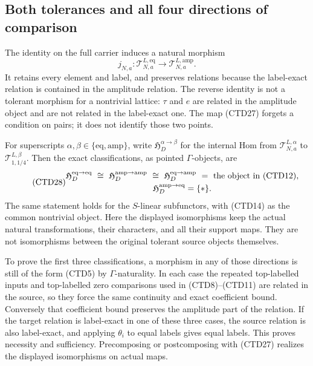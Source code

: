\subsection{Both tolerances and all four directions of comparison}

The identity on the full carrier induces a natural morphism
\begin{equation}\tag{CTD27}
j_{N,a}:\mathcal T^{L,\mathrm{eq}}_{N,a}
\longrightarrow\mathcal T^{L,\mathrm{amp}}_{N,a}.
\end{equation}
It retains every element and label, and preserves relations
because the label-exact relation is contained in the
amplitude relation. The reverse identity is not a tolerant
morphism for a nontrivial lattice: $\tau$ and $e$ are related
in the amplitude object and are not related in the label-exact
one. The map (CTD27) forgets a condition on pairs; it does
not identify those two points.

For superscripts $\alpha,\beta\in\{\mathrm{eq},\mathrm{amp}\}$,
write $\mathfrak H_D^{\alpha\to\beta}$ for the internal Hom
from $\mathcal T^{L,\alpha}_{N,a}$ to
$\mathcal T^{L,\beta}_{1,1/4}$. Then the exact classifications,
as pointed $\Gamma$-objects, are
\begin{equation}\tag{CTD28}
\begin{gathered}
\mathfrak H_D^{\mathrm{eq}\to\mathrm{eq}}
\ \cong\
\mathfrak H_D^{\mathrm{amp}\to\mathrm{amp}}
\ \cong\
\mathfrak H_D^{\mathrm{eq}\to\mathrm{amp}}
\ =\ \hbox{the object in (CTD12)},\\
\mathfrak H_D^{\mathrm{amp}\to\mathrm{eq}}=\{*\}.
\end{gathered}
\end{equation}
The same statement holds for the $S$-linear subfunctors, with
(CTD14) as the common nontrivial object.
Here the displayed isomorphisms keep the actual natural
transformations, their characters, and all their support maps.
They are not isomorphisms between the original tolerant
source objects themselves.

To prove the first three classifications, a morphism in any
of those directions is still of the form (CTD5) by
$\Gamma$-naturality. In each case the repeated top-labelled
inputs and top-labelled zero comparisons used in
(CTD8)--(CTD11) are related in the source, so they force the
same continuity and exact coefficient bound. Conversely
that coefficient bound preserves the amplitude part of the
relation. If the target relation is label-exact in one of
these three cases, the source relation is also label-exact,
and applying $\theta_i$ to equal labels gives equal labels.
This proves necessity and sufficiency. Precomposing or
postcomposing with (CTD27) realizes the displayed
isomorphisms on actual maps.

